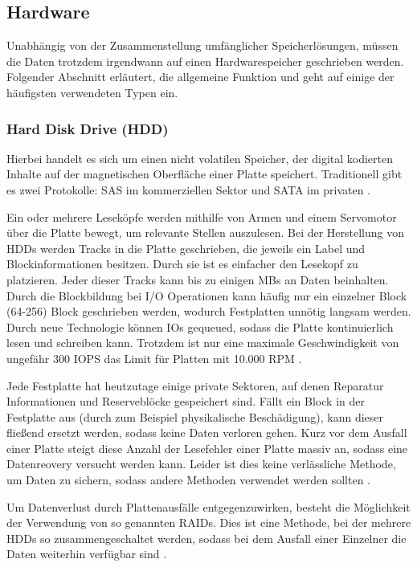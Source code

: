 \subsection{Hardware}

Unabhängig von der Zusammenstellung umfänglicher Speicherlösungen, müssen die Daten trotzdem irgendwann auf einen Hardwarespeicher geschrieben werden. Folgender Abschnitt erläutert, die allgemeine Funktion und geht auf einige der häufigsten verwendeten Typen ein.

\subsubsection{Hard Disk Drive (HDD)}

Hierbei handelt es sich um einen nicht volatilen Speicher, der digital kodierten Inhalte auf der magnetischen Oberfläche einer Platte speichert. Traditionell gibt es zwei Protokolle: SAS im kommerziellen Sektor und SATA im privaten \parencite{wikibooks.2016}.

Ein oder mehrere Leseköpfe werden mithilfe von Armen und einem Servomotor über die Platte bewegt, um relevante Stellen auszulesen. Bei der Herstellung von HDDs werden Tracks in die Platte geschrieben, die jeweils ein Label und Blockinformationen besitzen. Durch sie ist es einfacher den Lesekopf zu platzieren. Jeder dieser Tracks kann bis zu einigen MBs an Daten beinhalten. Durch die Blockbildung bei I/O Operationen kann häufig nur ein einzelner Block (64-256) Block geschrieben werden, wodurch Festplatten unnötig langsam werden. Durch neue Technologie können IOs gequeued, sodass die Platte kontinuierlich lesen und schreiben kann. Trotzdem ist nur eine maximale Geschwindigkeit von ungefähr 300 \gls{IOPS} das Limit für Platten mit 10.000 RPM \parencite[Kap. 3]{kaufmann.2016}.

Jede Festplatte hat heutzutage einige private Sektoren, auf denen Reparatur Informationen und Reserveblöcke gespeichert sind. Fällt ein Block in der Festplatte aus (durch zum Beispiel physikalische Beschädigung), kann dieser fließend ersetzt werden, sodass keine Daten verloren gehen. Kurz vor dem Ausfall einer Platte steigt diese Anzahl der Lesefehler einer Platte massiv an, sodass eine Datenreovery versucht werden kann. Leider ist dies keine verlässliche Methode, um Daten zu sichern, sodass andere Methoden verwendet werden sollten \parencite[Kap. 3]{kaufmann.2016}.

Um Datenverlust durch Plattenausfälle entgegenzuwirken, besteht die Möglichkeit der Verwendung von so genannten RAIDs. Dies ist eine Methode, bei der mehrere HDDs so zusammengeschaltet werden, sodass bei dem Ausfall einer Einzelner die Daten weiterhin verfügbar sind \parencite{wikibooks.2016}.

